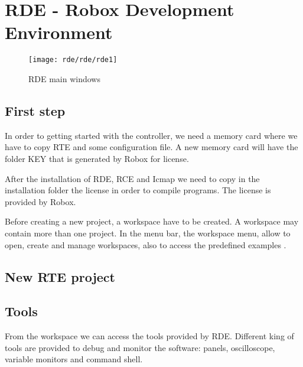 

\chapter{RDE - Robox Development Environment}

\begin{figure}
	\centering\texttt{[image: rde/rde/rde1]}
	\caption{RDE main windows}
	\label{figrde1}
\end{figure}

\section{First step}
In order to getting started with the controller, we need a memory card where we have to copy RTE and some configuration file. A new memory card will have the folder KEY that is generated by Robox for license.

After the installation of RDE, RCE and Icmap we need to copy in the installation folder the license in order to compile programs. The license is provided by Robox.

Before creating a new project, a workspace have to be created. A workspace may contain more than one project. In the menu bar, the workspace menu, allow to open, create and manage workspaces, also to access the predefined examples .

%	 
\section{New RTE project}

\section{Tools}
From the workspace we can access the tools provided by RDE. Different king of tools are provided to debug and monitor the software: panels, oscilloscope, variable monitors and command shell.

